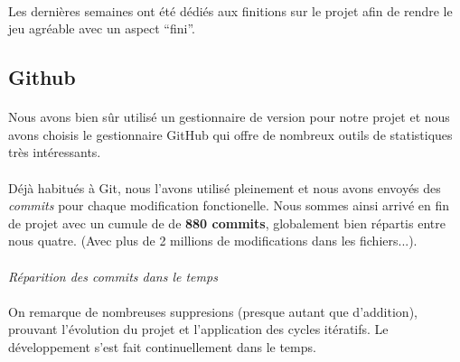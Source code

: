 \paragraph{}
Les dernières semaines ont été dédiés aux finitions sur le projet afin de rendre le jeu agréable avec un aspect “fini”.

\subsection{Github}

\paragraph{}
Nous avons bien sûr utilisé un gestionnaire de version pour notre projet et nous avons choisis le gestionnaire GitHub qui offre de nombreux outils de statistiques très intéressants.

\paragraph{}
Déjà habitués à Git, nous l'avons utilisé pleinement et nous avons envoyés des \emph{commits} pour chaque modification fonctionelle. Nous sommes ainsi arrivé en fin de projet avec un cumule de de \textbf{880 commits}, globalement bien répartis entre nous quatre. (Avec plus de 2 millions de modifications dans les fichiers...).

\paragraph{}
\noindent
{}
\begin{center}
\textit{Réparition des commits dans le temps}
\end{center}

\paragraph{}
On remarque de nombreuses suppresions (presque autant que d’addition), prouvant l’évolution du projet et l’application des cycles itératifs. Le développement s’est fait continuellement dans le temps.

